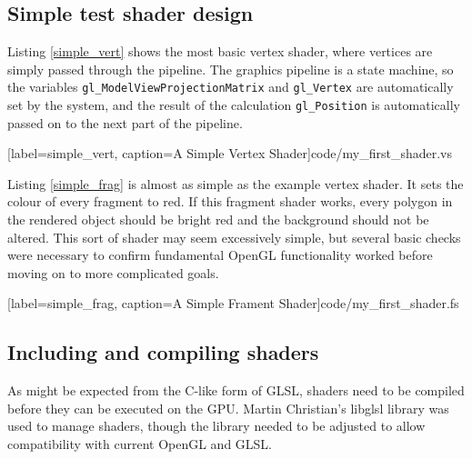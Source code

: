 \documentclass[MSc,paper=a4,pagesize=auto]{icldt}
\begin{document}
\subsection{Simple test shader design}
Listing \ref{simple_vert} shows the most basic vertex shader, where vertices are simply passed through the pipeline. The graphics pipeline is a state machine, so the variables \texttt{gl\_ModelViewProjectionMatrix} and \texttt{gl\_Vertex} are automatically set by the system, and the result of the calculation \texttt{gl\_Position} is automatically passed on to the next part of the pipeline.


  [label=simple_vert, caption=A Simple Vertex Shader]{code/my_first_shader.vs}

Listing \ref{simple_frag} is almost as simple as the example vertex shader. It sets the colour of every fragment to red. If this fragment shader works, every polygon in the rendered object should be bright red and the background should not be altered. This sort of shader may seem excessively simple, but several basic checks were necessary to confirm fundamental OpenGL functionality worked before moving on to more complicated goals.


  [label=simple_frag, caption=A Simple Frament Shader]{code/my_first_shader.fs}

\subsection{Including and compiling shaders}

As might be expected from the C-like form of GLSL, shaders need to be compiled before they can be executed on the GPU. Martin Christian's libglsl library was used to manage shaders, though the library needed to be adjusted to allow compatibility with current OpenGL and GLSL. 
\end{document}
